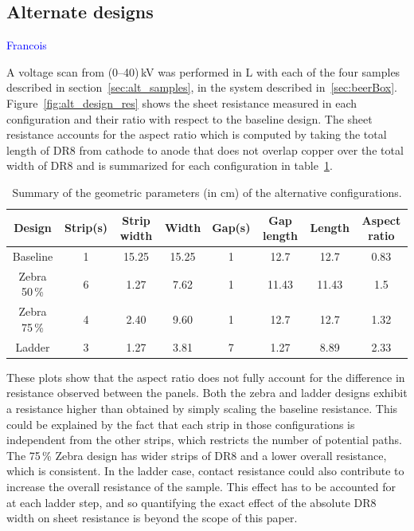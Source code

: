 \documentclass[a4paper,12pt]{article}
\begin{document}
\subsection{Alternate designs}
\textcolor{blue}{Francois}

A voltage scan from (0--40)\,kV was performed in L with each of the four samples described in section~\ref{sec:alt_samples}, in the system described in~\ref{sec:beerBox}. Figure~\ref{fig:alt_design_res} shows the sheet resistance measured in each configuration and their ratio with respect to the baseline design. The sheet resistance accounts for the aspect ratio which is computed by taking the total length of DR8 from cathode to anode that does not overlap copper over the total width of DR8 and is summarized for each configuration in table~\ref{tab:alt_design}.

\begin{table}[h]
    \centering
    \begin{tabular}{c|c|c|c|c|c|c|c}
         Design & Strip(s) & Strip width & Width & Gap(s) & Gap length & Length & Aspect ratio \\
         \hline
         Baseline & 1 & 15.25 & 15.25 & 1 & 12.7 & 12.7 & 0.83 \\
         Zebra 50\,\% & 6 & 1.27 & 7.62 & 1 & 11.43 & 11.43 & 1.5 \\
         Zebra 75\,\% & 4 & 2.40 & 9.60 & 1 & 12.7 & 12.7 & 1.32 \\
         Ladder & 3 & 1.27 & 3.81 & 7 & 1.27 & 8.89 & 2.33
    \end{tabular}
    \caption{Summary of the geometric parameters (in cm) of the alternative configurations.}
    \label{tab:alt_design}
\end{table}

These plots show that the aspect ratio does not fully account for the difference in resistance observed between the panels. Both the zebra and ladder designs exhibit a resistance higher than obtained by simply scaling the baseline resistance. This could be explained by the fact that each strip in those configurations is independent from the other strips, which restricts the number of potential paths. The 75\,\% Zebra design has wider strips of DR8 and a lower overall resistance, which is consistent. In the ladder case, contact resistance could also contribute to increase the overall resistance of the sample. This effect has to be accounted for at each ladder step, and so quantifying the exact effect of the absolute DR8 width on sheet resistance is beyond the scope of this paper.
\end{document}

